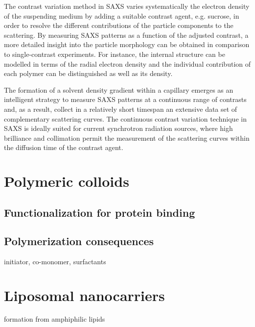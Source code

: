 The contrast variation method in SAXS varies systematically the electron density of the suspending medium by adding a suitable contrast agent, e.g. sucrose, in order to resolve the different contributions of the particle components to the scattering. By measuring SAXS patterns as a function of the adjusted contrast, a more detailed insight into the particle morphology can be obtained in comparison to single-contrast experiments\citep{bolze_situ_2004}. For instance, the internal structure can be modelled in terms of the radial electron density\citep{dingenouts_radial_1994,dingenouts_analysis_1999,ballauff_analysis_2011,ballauff_small-angle_1996} and the individual contribution of each polymer can be distinguished\citep{beyer_saxs_1990,grunder_analysis_1991,grunder_small-angle_1993,ottewill_characterization_1995,bolze_small-angle_1997,dingenouts_structure_1994} as well as its density\citep{mykhaylyk_application_2007}.

The formation of a solvent density gradient within a capillary emerges as an intelligent strategy to measure SAXS patterns at a continuous range of contrasts and, as a result, collect in a relatively short timespan an extensive data set of complementary scattering curves\citep{garcia-diez_nanoparticle_2015}. The continuous contrast variation technique in SAXS is ideally suited for current synchrotron radiation sources, where high brilliance and collimation permit the measurement of the scattering curves within the diffusion time of the contrast agent.

\label{chap:introduction}

\section{Polymeric colloids}
\subsection{Functionalization for protein binding}



\subsection{Polymerization consequences}
initiator, co-monomer, surfactants

\section{Liposomal nanocarriers}
formation from amphiphilic lipids
